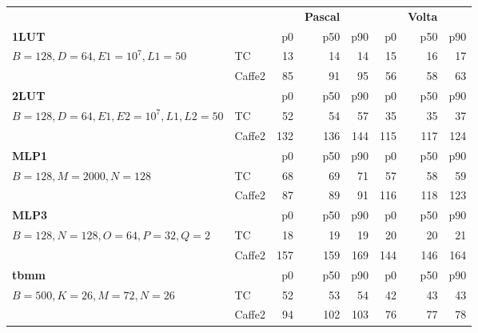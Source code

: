 \renewcommand{\arraystretch}{.5}
\begin{tabular}{llrrrrrr}
\toprule
	      &  &  & {\textbf{Pascal}} &  &  & {\textbf{Volta}} & \\
\textbf{1LUT} &  & p0 & p50 & p90 & p0 & p50 & p90\\
\midrule
\multirow{2}{*}{$B = 128, D = 64, E1 = 10^7, L1 = 50$}
  & TC     & 13 & 14 & 14 & 15 & 16 & 17\\
  & Caffe2 & 85 & 91 & 95 & 56 & 58 & 63\\

\toprule
\textbf{2LUT} &  & p0 & p50 & p90 & p0 & p50 & p90\\
\midrule
\multirow{2}{*}{
$B = 128, D = 64, E1, E2 = 10^7, L1, L2 = 50$}
  & TC     & 52 & 54 & 57 & 35 & 35 & 37\\
  & Caffe2 & 132 & 136 & 144 & 115 & 117 & 124\\

\toprule
\textbf{MLP1} &  & p0 & p50 & p90 & p0 & p50 & p90\\
\midrule
\multirow{2}{*}{$B = 128, M = 2000, N = 128$}
  & TC     & 68 & 69 & 71 & 57 & 58 & 59\\
  & Caffe2 & 87 & 89 & 91 & 116 & 118 & 123\\

\toprule
\textbf{MLP3} &  & p0 & p50 & p90 & p0 & p50 & p90\\
\midrule
\multirow{2}{*}{$B = 128, N = 128, O = 64, P = 32, Q = 2$}
  & TC     & 18 & 19 & 19 & 20 & 20 & 21\\
  & Caffe2 & 157 & 159 & 169 & 144 & 146 & 164\\

\toprule
\textbf{tbmm} &  & p0 & p50 & p90 & p0 & p50 & p90\\
\midrule
\multirow{2}{*}{$B = 500, K = 26, M = 72, N = 26$}
  & TC     & 52 & 53 & 54 & 42 & 43 & 43\\
  & Caffe2 & 94 & 102 & 103 & 76 & 77 & 78\\


\end{tabular}
